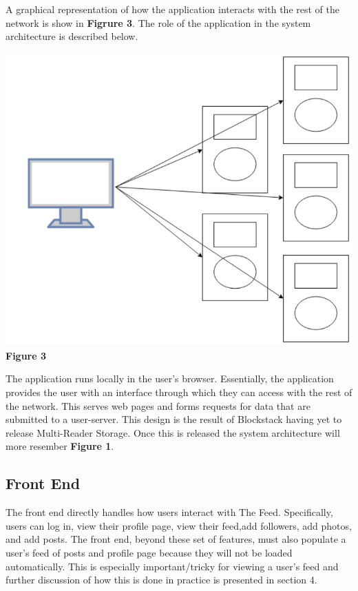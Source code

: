 \documentclass[pageno]{jpaper}
\begin{document}
\begin{multicols*}{2}
A graphical representation of how the application interacts with the rest of the network is show in \textbf{Figrure 3}. The role of the application in the system architecture is described below.

\begin{center}
	\includegraphics[scale=0.4]{pic2.jpg} \\
	\textbf{Figure 3}
\end{center}

The application runs locally in the user's browser. Essentially, the application provides the user with an interface through which they can access with the rest of the network. This serves web pages and forms requests for data that are submitted to a user-server. This design is the result of Blockstack having yet to release Multi-Reader Storage. Once this is released the system architecture will more resember \textbf{Figure 1}.

\subsection{Front End}
\label{section:frontend}

The front end directly handles how users interact with The Feed. Specifically, users can log in, view their profile page, view their feed,add followers, add photos, and add posts. The front end, beyond these set of features, must also populate a user's feed of posts and profile page because they will not be loaded automatically. This is especially important/tricky for viewing a user's feed and further discussion of how this is done in practice is presented in section 4.\newline


\end{multicols*}
\end{document}
